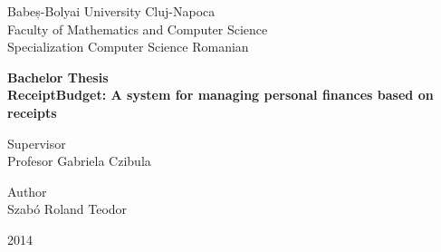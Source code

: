 	
\begin{titlepage}
    \begin{center}
        \vspace*{1cm}
        
        \Large
        Babeș-Bolyai University Cluj-Napoca \\
		Faculty of Mathematics and Computer Science \\
		Specialization Computer Science Romanian

		\vspace{1.5cm}
        \Huge
        \textbf{Bachelor Thesis} \\
        \textbf{ReceiptBudget: A system for managing personal finances based on receipts}
\end{center}        

        \vspace{1.5cm}
		\Large
        \begin{minipage}[t]{0.5\textwidth}
       		Supervisor \\
        	Profesor Gabriela Czibula \\
		\end{minipage}
		\begin{minipage}[t]{0.5\textwidth}
			\begin{raggedleft}
				Author \\
				Szabó Roland Teodor
			\end{raggedleft}
		\end{minipage}
        \vfill

        \vspace{0.8cm}
\begin{center}
	\Huge
        2014
\end{center}
        
\end{titlepage}